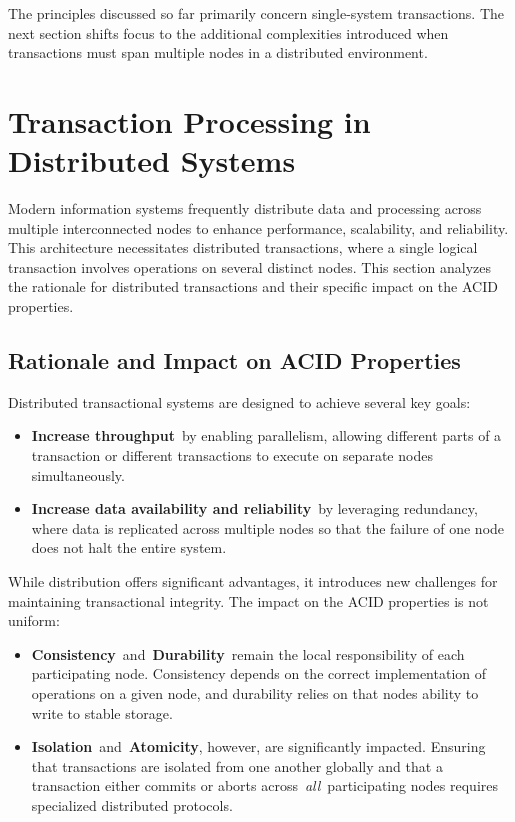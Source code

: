 \documentclass{scrbook}
\begin{document}
The principles discussed so far primarily concern single-system
transactions. The next section shifts focus to the additional
complexities introduced when transactions must span multiple nodes in a
distributed environment.

\chapter{Transaction Processing in Distributed Systems}

Modern information systems frequently distribute data and processing
across multiple interconnected nodes to enhance performance,
scalability, and reliability. This architecture necessitates distributed
transactions, where a single logical transaction involves operations on
several distinct nodes. This section analyzes the rationale for
distributed transactions and their specific impact on the ACID
properties.

\section{Rationale and Impact on ACID Properties}

Distributed transactional systems are designed to achieve several key
goals:

\begin{itemize}
\item
  \textbf{Increase throughput}~by enabling parallelism, allowing
  different parts of a transaction or different transactions to execute
  on separate nodes simultaneously.
\item
  \textbf{Increase data availability and reliability}~by leveraging
  redundancy, where data is replicated across multiple nodes so that the
  failure of one node does not halt the entire system.
\end{itemize}

While distribution offers significant advantages, it introduces new
challenges for maintaining transactional integrity. The impact on the
ACID properties is not uniform:

\begin{itemize}
\item
  \textbf{Consistency}~and~\textbf{Durability}~remain the local
  responsibility of each participating node. Consistency depends on the
  correct implementation of operations on a given node, and durability
  relies on that node\textquotesingle s ability to write to stable
  storage.
\item
  \textbf{Isolation}~and~\textbf{Atomicity}, however, are significantly
  impacted. Ensuring that transactions are isolated from one another
  globally and that a transaction either commits or aborts
  across~\emph{all}~participating nodes requires specialized distributed
  protocols.
\end{itemize}
\end{document}
